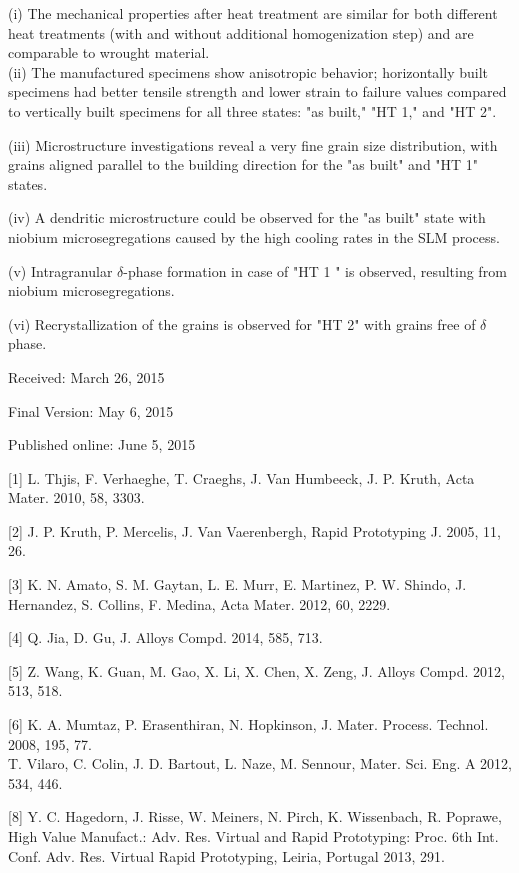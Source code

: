 \documentclass[10pt]{article}
\begin{document}
(i) The mechanical properties after heat treatment are similar for both different heat treatments (with and without additional homogenization step) and are comparable to wrought material.\\
(ii) The manufactured specimens show anisotropic behavior; horizontally built specimens had better tensile strength and lower strain to failure values compared to vertically built specimens for all three states: "as built," "HT 1," and "HT 2".

(iii) Microstructure investigations reveal a very fine grain size distribution, with grains aligned parallel to the building direction for the "as built" and "HT 1" states.

(iv) A dendritic microstructure could be observed for the "as built" state with niobium microsegregations caused by the high cooling rates in the SLM process.

(v) Intragranular $\delta$-phase formation in case of "HT 1 " is observed, resulting from niobium microsegregations.

(vi) Recrystallization of the grains is observed for "HT 2" with grains free of $\delta$ phase.

Received: March 26, 2015

Final Version: May 6, 2015

Published online: June 5, 2015

[1] L. Thjis, F. Verhaeghe, T. Craeghs, J. Van Humbeeck, J. P. Kruth, Acta Mater. 2010, 58, 3303.

[2] J. P. Kruth, P. Mercelis, J. Van Vaerenbergh, Rapid Prototyping J. 2005, 11, 26.

[3] K. N. Amato, S. M. Gaytan, L. E. Murr, E. Martinez, P. W. Shindo, J. Hernandez, S. Collins, F. Medina, Acta Mater. 2012, 60, 2229.

[4] Q. Jia, D. Gu, J. Alloys Compd. 2014, 585, 713.

[5] Z. Wang, K. Guan, M. Gao, X. Li, X. Chen, X. Zeng, J. Alloys Compd. 2012, 513, 518.

[6] K. A. Mumtaz, P. Erasenthiran, N. Hopkinson, J. Mater. Process. Technol. 2008, 195, 77.\\
[7] T. Vilaro, C. Colin, J. D. Bartout, L. Naze, M. Sennour, Mater. Sci. Eng. A 2012, 534, 446.

[8] Y. C. Hagedorn, J. Risse, W. Meiners, N. Pirch, K. Wissenbach, R. Poprawe, High Value Manufact.: Adv. Res. Virtual and Rapid Prototyping: Proc. 6th Int. Conf. Adv. Res. Virtual Rapid Prototyping, Leiria, Portugal 2013, 291.
\end{document}
